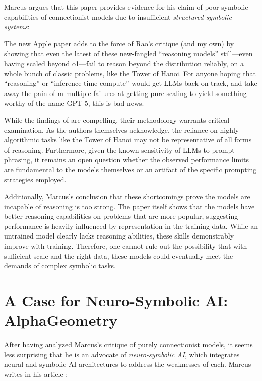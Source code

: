 \documentclass[../../main.tex]{subfiles}
\begin{document}
Marcus argues that this paper provides evidence for his claim of poor symbolic capabilities of connectionist models due to insufficient \emph{structured symbolic systems}:

\begin{citecallout}
    The new Apple paper adds to the force of Rao's critique (and my own) by showing that even the latest of these new-fangled “reasoning models” still—even having scaled beyond o1—fail to reason beyond the distribution reliably, on a whole bunch of classic problems, like the Tower of Hanoi. For anyone hoping that “reasoning” or “inference time compute” would get LLMs back on track, and take away the pain of m multiple failures at getting pure scaling to yield something worthy of the name GPT-5, this is bad news.
\end{citecallout}

\begin{critique}
    While the findings of \textcite{illusion-of-thinking} are compelling, their methodology warrants critical examination. As the authors themselves acknowledge, the reliance on highly algorithmic tasks like the Tower of Hanoi may not be representative of all forms of reasoning. Furthermore, given the known sensitivity of LLMs to prompt phrasing, it remains an open question whether the observed performance limits are fundamental to the models themselves or an artifact of the specific prompting strategies employed.

    Additionally, Marcus's conclusion that these shortcomings prove the models are incapable of reasoning is too strong. The paper itself shows that the models have better reasoning capabilities on problems that are more popular, suggesting performance is heavily influenced by representation in the training data. While an untrained model clearly lacks reasoning abilities, these skills demonstrably improve with training. Therefore, one cannot rule out the possibility that with sufficient scale and the right data, these models could eventually meet the demands of complex symbolic tasks.
\end{critique}

\section{A Case for Neuro-Symbolic AI: AlphaGeometry}
After having analyzed Marcus's critique of purely connectionist models, it seems less surprising that he is an advocate of \emph{neuro-symbolic AI}, which integrates neural and symbolic AI architectures to address the weaknesses of each. Marcus writes in his article :
\end{document}
